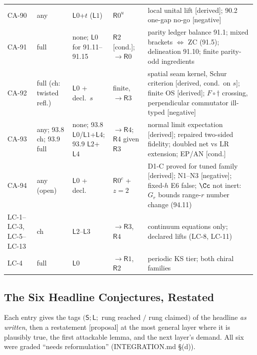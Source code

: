\begin{center}
\begin{tabular}{p{2.5cm}p{1.2cm}p{1.2cm}p{1.6cm}p{7.3cm}}
CA-90 & any & \(\mathsf L0\)+\(t\) (\(\mathsf L1\)) & \(\mathsf R0^u\) & local unital lift [derived]; 90.2 one-gap no-go [negative] \\
CA-91 & full & none; \(\mathsf L0\) for 91.11--91.15 & \(\mathsf R2\) [cond.]; \(\to\mathsf R0\) & parity ledger balance 91.1; mixed brackets \(\Leftrightarrow\) ZC (91.5); delineation 91.10; finite parity-odd ingredients \\
CA-92 & full (ch: twisted refl.) & \(\mathsf L0\) + decl.\ \(s\) & finite, \(\to\mathsf R3\) & spatial seam kernel, Schur criterion [derived, cond.\ on \(s\)]; finite OS [derived]; \(F\circ\dagger\) crossing, perpendicular commutator ill-typed [negative] \\
CA-93 & any; 93.8 ch; 93.9 full & none; 93.8 \(\mathsf L0\)/\(\mathsf L1\)+\(\mathsf L4\); 93.9 \(\mathsf L2\)+\(\mathsf L4\) & \(\to\mathsf R4\); \(\mathsf R4\) given \(\mathsf R3\) & normal limit expectation [derived]; repaired two-sided fidelity; doubled net vs LR extension; EP/AN [cond.] \\
CA-94 & any (open) & \(\mathsf L0\) + decl.\ & \(\mathsf R0^{c}\) + \(z{=}2\) & D1-C proved for tuned family [derived]; N1--N3 [negative]; fixed-\(h\) E6 false; \(\Cc\) not inert: \(G_r\) bounds range-\(r\) number change (94.11) \\
LC-1--LC-3, LC-5--LC-13 & ch & \(\mathsf L2\)--\(\mathsf L3\) & \(\to\mathsf R3\), \(\mathsf R4\) & continuum equations only; declared lifts (LC-8, LC-11) \\
LC-4 & full & \(\mathsf L0\) & \(\to\mathsf R1\), \(\mathsf R2\) & periodic KS tier; both chiral families \\
\bottomrule
\end{tabular}
\end{center}

\subsection{The Six Headline Conjectures, Restated}
\label{sec:layered-conjectures}

Each entry gives the tags \((\mathsf S;\mathsf L;\) rung reached \(/\) rung claimed\()\) of the headline \emph{as written},
then a restatement [proposal] at the most general layer where it is plausibly true, the first attackable lemma, and
the next layer's demand.  All six were graded ``needs reformulation'' (INTEGRATION.md \S(d)).

